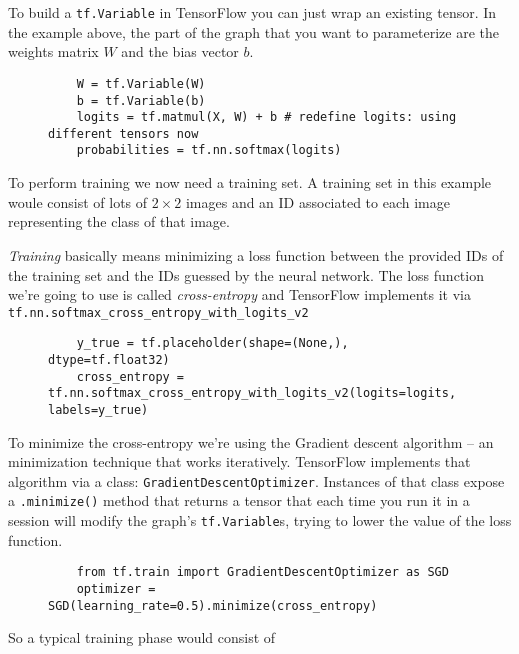 To build a \texttt{tf.Variable} in TensorFlow you can just wrap an
existing tensor. In the example above, the part of the graph that you
want to parameterize are the weights matrix $W$ and the bias vector
$b$.

\begin{figure}
  \begin{verbatim}
    W = tf.Variable(W)
    b = tf.Variable(b)
    logits = tf.matmul(X, W) + b # redefine logits: using different tensors now
    probabilities = tf.nn.softmax(logits)
  \end{verbatim}
  \caption{}
\end{figure}

To perform training we now need a training set. A training set in this
example woule consist of lots of \(2 \times 2\) images and an ID
associated to each image representing the class of that image.

\emph{Training} basically means minimizing a loss function between the
provided IDs of the training set and the IDs guessed by the neural
network. The loss function we're going to use is called
\emph{cross-entropy} and TensorFlow implements it via
\texttt{tf.nn.softmax\_cross\_entropy\_with\_logits\_v2}

\begin{figure}
  \begin{verbatim}
    y_true = tf.placeholder(shape=(None,), dtype=tf.float32)
    cross_entropy = tf.nn.softmax_cross_entropy_with_logits_v2(logits=logits, labels=y_true)
  \end{verbatim}
  \caption{}
\end{figure}

To minimize the cross-entropy we're using the Gradient descent
algorithm -- an minimization technique that works iteratively.
TensorFlow implements that algorithm via a class:
\texttt{GradientDescentOptimizer}. Instances of that class expose
a \texttt{.minimize()} method that returns a tensor that each time you
run it in a session will modify the graph's \texttt{tf.Variable}s,
trying to lower the value of the loss function.

\begin{figure}
  \begin{verbatim}
    from tf.train import GradientDescentOptimizer as SGD
    optimizer = SGD(learning_rate=0.5).minimize(cross_entropy)
  \end{verbatim}
  \caption{}
\end{figure}

So a typical training phase would consist of

